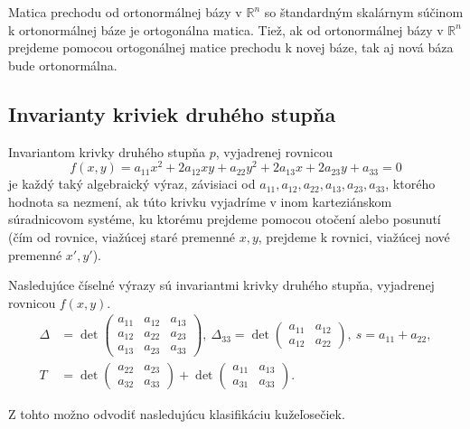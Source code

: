 \begin{theorem} 
Matica prechodu od ortonormálnej bázy v $\mathbb{R}^n$ so štandardným skalárnym súčinom k ortonormálnej báze je ortogonálna matica. Tiež, ak od ortonormálnej bázy v $\mathbb{R}^n$ prejdeme pomocou ortogonálnej matice prechodu k novej báze,
tak aj nová báza bude ortonormálna.
\end{theorem}

\subsection{Invarianty kriviek druhého stupňa}
\begin{definition}
Invariantom krivky druhého stupňa $p$, vyjadrenej rovnicou
$$
f(x, y) = a_{11}x^2 + 2a_{12}xy + a_{22}y^2 + 2a_{13}x + 2a_{23}y + a_{33} = 0
$$
je každý taký algebraický výraz, závisiaci od \(a_{11}, a_{12}, a_{22}, a_{13}, a_{23}, a_{33}\), ktorého hodnota sa nezmení, ak túto krivku vyjadríme v inom karteziánskom súradnicovom systéme, ku ktorému prejdeme pomocou otočení alebo posunutí (čím od rovnice, viažúcej staré premenné \(x, y\), prejdeme k rovnici, viažúcej nové premenné \(x', y'\)).
\end{definition}

\begin{theorem}
Nasledujúce číselné výrazy sú invariantmi krivky druhého stupňa, vyjadrenej rovnicou $f(x, y)$.
\begin{align*}
\Delta &= \det \begin{pmatrix} 
a_{11} & a_{12} & a_{13} \\ 
a_{12} & a_{22} & a_{23} \\
a_{13} & a_{23} & a_{33} \end{pmatrix}, \
\Delta_{33} = \det \begin{pmatrix} a_{11} & a_{12} \\ a_{12} & a_{22} \end{pmatrix}, \
s = a_{11} + a_{22}, \\
T &= \det \begin{pmatrix} 
a_{22} & a_{23} \\
a_{32} & a_{33}  \end{pmatrix} + \det \begin{pmatrix} 
a_{11} & a_{13} \\ 
a_{31} & a_{33} \end{pmatrix}.
\end{align*}
\end{theorem}
Z tohto možno odvodiť nasledujúcu klasifikáciu kužeľosečiek.

